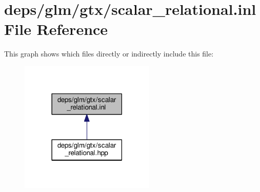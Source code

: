 \hypertarget{scalar__relational_8inl}{}\section{deps/glm/gtx/scalar\+\_\+relational.inl File Reference}
\label{scalar__relational_8inl}
This graph shows which files directly or indirectly include this file\+:
\nopagebreak
\begin{figure}[H]
\begin{center}
\leavevmode
\includegraphics[width=182pt]{d8/d80/scalar__relational_8inl__dep__incl}
\end{center}
\end{figure}
